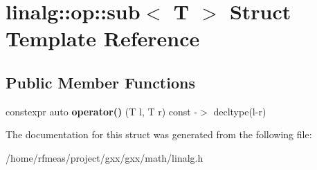 \hypertarget{structlinalg_1_1op_1_1sub}{}\section{linalg\+:\+:op\+:\+:sub$<$ T $>$ Struct Template Reference}
\label{structlinalg_1_1op_1_1sub}
\subsection*{Public Member Functions}
\begin{DoxyCompactItemize}
\item 
constexpr auto {\bfseries operator()} (T l, T r) const -\/$>$ decltype(l-\/r)\hypertarget{structlinalg_1_1op_1_1sub_abef7420294b064c557dddc231f493ea7}{}\label{structlinalg_1_1op_1_1sub_abef7420294b064c557dddc231f493ea7}

\end{DoxyCompactItemize}


The documentation for this struct was generated from the following file\+:\begin{DoxyCompactItemize}
\item 
/home/rfmeas/project/gxx/gxx/math/linalg.\+h\end{DoxyCompactItemize}
